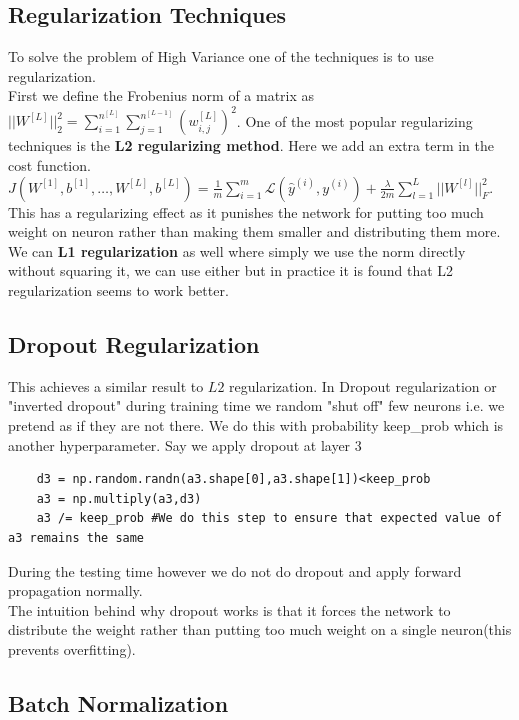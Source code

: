 \documentclass[12pt]{article}
\begin{document}
\subsection{Regularization Techniques}
To solve the problem of High Variance one of the techniques is to use regularization. \\
First we define the Frobenius norm of a matrix as 
$||W^{[L]}||^{2}_{2} = \sum_{i=1}^{n^{[L]}} \sum_{j=1}^{n^{[L-1]}}(w_{i,j}^{[L]})^2$. One of the most popular regularizing techniques is the \textbf{L2 regularizing method}. Here we add an extra term in the cost function. \\ 
$J(W^{[1]},b^{[1]},\dots,W^{[L]},b^{[L]}) = \frac{1}{m} \sum_{i=1}^{m}\mathcal{L}(\hat{y}^{(i)},y^{(i)}) + \frac{\lambda}{2m} \sum_{l=1}^{L} ||W^{[l]}||^{2}_{F}$. This has a regularizing effect as it punishes the network for putting too much weight on neuron rather than making them smaller and distributing them more. 
We can \textbf{L1 regularization} as well where simply we use the norm directly without squaring it, we can use either but in practice it is found that L2 regularization seems to work better. 
\subsection{Dropout Regularization}
This achieves a similar result to $L2$ regularization. In Dropout regularization or "inverted dropout" during training time we random "shut off" few neurons i.e. we pretend as if they are not there. We do this with probability keep\_prob which is another hyperparameter. 
Say we apply dropout at layer 3 
\begin{lstlisting}
    d3 = np.random.randn(a3.shape[0],a3.shape[1])<keep_prob
    a3 = np.multiply(a3,d3)
    a3 /= keep_prob #We do this step to ensure that expected value of a3 remains the same
\end{lstlisting}
During the testing time however we do not do dropout and apply forward propagation normally. \\ 
The intuition behind why dropout works is that it forces the network to distribute the weight rather than putting too much weight on a single neuron(this prevents overfitting). 
\subsection{Batch Normalization}
\end{document}
